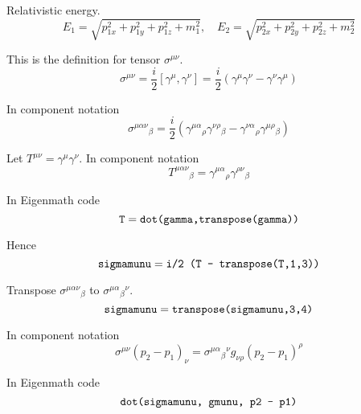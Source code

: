 Relativistic energy.
\begin{equation*}
E_1=\sqrt{p_{1x}^2+p_{1y}^2+p_{1z}^2+m_1^2},\quad
E_2=\sqrt{p_{2x}^2+p_{2y}^2+p_{2z}^2+m_2^2}
\end{equation*}

This is the definition for tensor $\sigma^{\mu\nu}$.
\begin{equation*}
\sigma^{\mu\nu}=\frac{i}{2}\left[\gamma^\mu,\gamma^\nu\right]
=\frac{i}{2}\left(\gamma^\mu\gamma^\nu-\gamma^\nu\gamma^\mu\right)
\end{equation*}

In component notation
\begin{equation*}
\sigma^{\mu\alpha\nu}{}_\beta
=\frac{i}{2}\left(\gamma^{\mu\alpha}{}_\rho\gamma^{\nu\rho}{}_\beta
-\gamma^{\nu\alpha}{}_\rho\gamma^{\mu\rho}{}_\beta\right)
\end{equation*}

Let $T^{\mu\nu}=\gamma^\mu\gamma^\nu$.
In component notation
\begin{equation*}
T^{\mu\alpha\nu}{}_\beta
=\gamma^{\mu\alpha}{}_\rho\gamma^{\rho\nu}{}_\beta
\end{equation*}

In Eigenmath code
\begin{equation*}
\text{\tt T}=\text{\tt dot(gamma,transpose(gamma))}
\end{equation*}

Hence
\begin{equation*}
\text{\tt sigmamunu}=\text{\tt i/2 (T - transpose(T,1,3))}
\end{equation*}

Transpose $\sigma^{\mu\alpha\nu}{}_\beta$ to $\sigma^{\mu\alpha}{}_\beta{}^\nu$.
\begin{equation*}
\text{\tt sigmamunu}=\text{\tt transpose(sigmamunu,3,4)}
\end{equation*}

In component notation
\begin{equation*}
\sigma^{\mu\nu}(p_2-p_1)_\nu
=\sigma^{\mu\alpha}{}_\beta{}^{\nu}g_{\nu\rho}(p_2-p_1)^\rho
\end{equation*}

In Eigenmath code
\begin{equation*}
\text{\tt dot(sigmamunu, gmunu, p2 - p1)}
\end{equation*}


